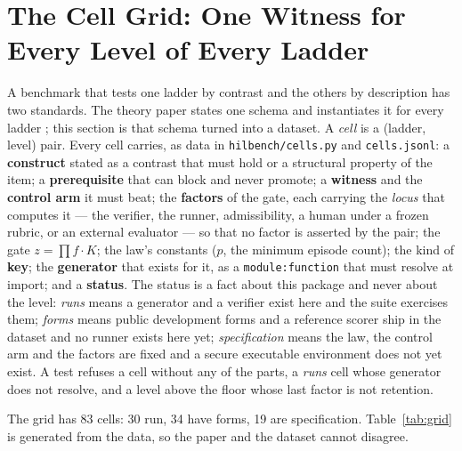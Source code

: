 \documentclass[11pt]{article}
\theoremstyle{definition}
\begin{document}
\section{The Cell Grid: One Witness for Every Level of Every Ladder}\label{sec:grid}

A benchmark that tests one ladder by contrast and the others by description has two standards. The theory paper states one schema and instantiates it for every ladder \citep{yang2026unified}; this section is that schema turned into a dataset. A \emph{cell} is a (ladder, level) pair. Every cell carries, as data in \texttt{hilbench/cells.py} and \texttt{cells.jsonl}: a \textbf{construct} stated as a contrast that must hold or a structural property of the item; a \textbf{prerequisite} that can block and never promote; a \textbf{witness} and the \textbf{control arm} it must beat; the \textbf{factors} of the gate, each carrying the \emph{locus} that computes it --- the verifier, the runner, admissibility, a human under a frozen rubric, or an external evaluator --- so that no factor is asserted by the pair; the gate $z = \prod f \cdot K$; the law's constants ($p$, the minimum episode count); the kind of \textbf{key}; the \textbf{generator} that exists for it, as a \texttt{module:function} that must resolve at import; and a \textbf{status}. The status is a fact about this package and never about the level: \emph{runs} means a generator and a verifier exist here and the suite exercises them; \emph{forms} means public development forms and a reference scorer ship in the dataset and no runner exists here yet; \emph{specification} means the law, the control arm and the factors are fixed and a secure executable environment does not yet exist. A test refuses a cell without any of the parts, a \emph{runs} cell whose generator does not resolve, and a level above the floor whose last factor is not retention.

The grid has 83 cells: 30 run, 34 have forms, 19 are specification. Table~\ref{tab:grid} is generated from the data, so the paper and the dataset cannot disagree.


\end{document}
